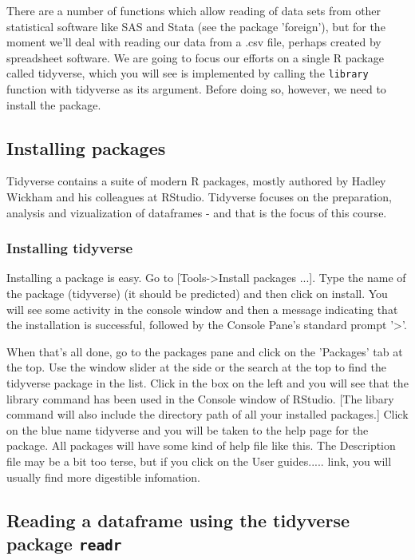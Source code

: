 \documentclass[titlepage]{book}\usepackage{knitr}
\begin{document}
There are a number of functions which allow reading of data sets from other statistical software like SAS and Stata (see the package 'foreign'), but for the moment we'll deal with reading our data from a .csv file, perhaps created by spreadsheet software. We are going to focus our efforts on a single R package called tidyverse, which you will see is implemented by calling the \texttt{library} function with tidyverse as its argument.  Before doing so, however, we need to install the package.

\subsection{Installing packages} 

Tidyverse contains a suite of modern R packages, mostly authored by Hadley Wickham and his colleagues at RStudio. Tidyverse focuses on the preparation, analysis and vizualization of dataframes - and that is the focus of this course.  

\subsubsection{Installing tidyverse}
Installing a package is easy. Go to [Tools->Install packages ...]. Type the name of the package (tidyverse) (it should be predicted) and then click on install. You will see some activity in the console window and then a message indicating that the installation is successful, followed by the Console Pane's standard prompt '>'.

When that's all done, go to the packages pane and click on the 'Packages' tab at the top. Use the window slider at the side or the search at the top to find the tidyverse package in the list. Click in the box on the left and you will see that the library command has been used in the Console window of RStudio. [The libary command will also include the directory path of all your installed packages.] Click on the blue name tidyverse and you will be taken to the help page for the package. All packages will have some kind of help file like this. The Description file may be a bit too terse, but if you click on the User guides..... link, you will usually find more digestible infomation.

\subsection{Reading a dataframe using the tidyverse package \texttt{readr}}
\end{document}
